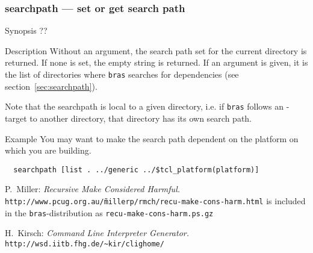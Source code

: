 \documentclass[11pt]{scrartcl}
\newcommand{\bras}{\texttt{bras}}
\begin{document}
\subsubsection{searchpath --- set or get search path}
\begin{Describe}
\item[Synopsis]  ??
\item[Description] Without an argument, the search path set for the
  current directory is returned. If none is set, the empty string is
  returned. If an argument is given, it is the list of directories
  where \bras{} searches for dependencies (see
  section~\ref{sec:searchpath}). 

  Note that the searchpath is local to a given directory, i.e. if
  \bras{} follows an -target to another directory, that
  directory has its own search path.
\item[Example]
You may want to make the search path dependent on the platform on
which you are building.
\begin{verbatim}
  searchpath [list . ../generic ../$tcl_platform(platform)]
\end{verbatim}
\end{Describe}

\begin{thebibliography}{9}

P.~Miller:
\textit{Recursive Make Considered Harmful.} 
\texttt{http://www.pcug\hspace{0pt}.org\hspace{0pt}.au/\~millerp/rmch/recu-make-cons-harm.html}
is included in the \bras-distribution as
\texttt{recu-make-cons-harm.ps.gz}

H.~Kirsch:
\textit{Command Line Interpreter Generator.}
\texttt{http://wsd.ii\-tb\hspace{0pt}.fhg.de/\~{}kir/clighome/}

\end{thebibliography}


\renewenvironment{theindex}{%
  \renewcommand\item{\par\hangindent 40pt}
  \twocolumn
  \section{Index}
}{\onecolumn}
\printindex
\end{document}
